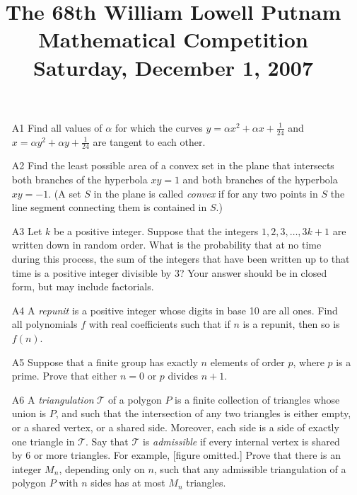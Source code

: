 \documentclass[amssymb,twocolumn,pra,10pt,aps]{revtex4-1}
\begin{document}
\title{The 68th William Lowell Putnam Mathematical Competition \\
    Saturday, December 1, 2007}
\maketitle

\begin{itemize}

\item[A1]
Find all values of $\alpha$ for which the curves $y = \alpha x^2 +
\alpha x + \frac{1}{24}$ and $x = \alpha y^2 + \alpha y + \frac{1}{24}$
are tangent to each other.

\item[A2]
Find the least possible area of a convex set in the plane that
intersects both branches of the hyperbola $xy = 1$ and both branches of
the hyperbola $xy = -1$. (A set $S$ in the plane is called \emph{convex}
if for any two points in $S$ the line segment connecting them is
contained in $S$.)

\item[A3]
Let $k$ be a positive integer. Suppose that the integers $1, 2, 3,
\dots, 3k+1$ are written down in random order. What is the probability
that at no time during this process, the sum of the integers that have
been written up to that time is a positive integer divisible by 3? Your
answer should be in closed form, but may include factorials.

\item[A4]
A \emph{repunit} is a positive integer whose digits in base 10 are
all ones. Find all polynomials $f$ with real coefficients such that if
$n$ is a repunit, then so is $f(n)$.

\item[A5]
Suppose that a finite group has exactly $n$ elements of order $p$,
where $p$ is a prime. Prove that either $n=0$ or $p$ divides $n+1$.

\item[A6]
A \emph{triangulation} $\mathcal{T}$ of a polygon $P$ is a finite
collection of triangles whose union is $P$, and such that the
intersection of any two triangles is either empty, or a shared vertex,
or a shared side. Moreover, each side is a side of exactly one triangle
in $\mathcal{T}$. Say that $\mathcal{T}$ is \emph{admissible} if every
internal vertex is shared by 6 or more triangles. For example, [figure
omitted.] Prove that there is an integer $M_n$, depending only on $n$,
such that any admissible triangulation of a polygon $P$ with $n$ sides
has at most $M_n$ triangles.


\end{itemize}
\end{document}
